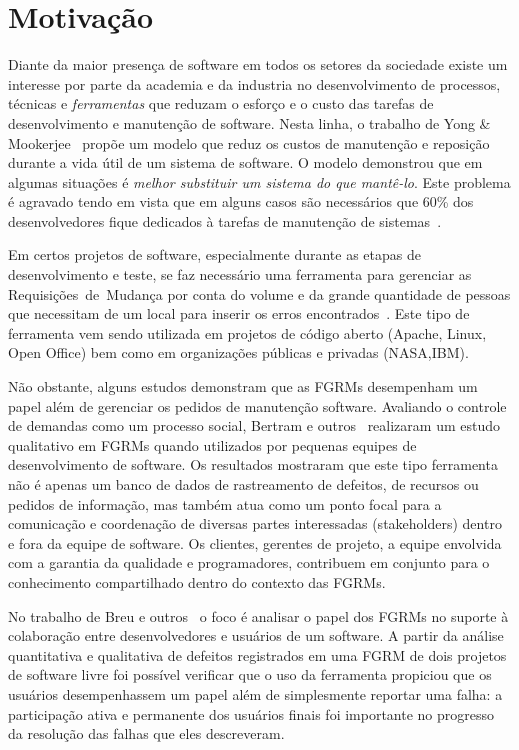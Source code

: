 \section{Motivação}
\label{sec:intro-motivacao}

Diante da maior presença de software em todos os setores da sociedade existe um
interesse por parte da academia e da industria no desenvolvimento de processos,
técnicas e \textit{ferramentas} que reduzam o esforço e o custo das tarefas de
desenvolvimento e manutenção de software. Nesta linha, o trabalho de Yong \&
Mookerjee~\cite{1423995}  propõe um modelo que reduz os custos de manutenção e
reposição durante a vida útil de um sistema de software. O modelo demonstrou que
em algumas situações é \textit{melhor substituir um sistema do que mantê-lo}.
Este pro\-ble\-ma é agravado tendo em vista que em alguns casos são necessários
que 60\% dos desenvolvedores fique dedicados à tarefas de manutenção de
sistemas~\cite{Zhang_2003}.

Em certos projetos de software, especialmente durante as etapas de
desenvolvimento e teste, se faz necessário uma ferramenta para gerenciar
as Requisições~de~Mudança por conta do volume e da grande quantidade de pessoas
que necessitam de um local para inserir os erros encontrados~\cite{1407819}.
Este tipo de ferramenta vem sendo utilizada em projetos de código
aberto (Apache, Linux, Open Office) bem como em organizações públicas e privadas
(NASA,IBM).

Não obstante, alguns estudos demonstram que as FGRMs desempenham um papel além
de gerenciar os pedidos de manutenção software. Avaliando o controle de demandas
como um processo social, Bertram e
outros~\cite{Bertram:2010:CCB:1718918.1718972} realizaram um estudo qualitativo
em FGRMs quando utilizados por pequenas equipes de desenvolvimento de software.
Os resultados mostraram que este tipo ferramenta não é apenas um banco de dados
de rastreamento de defeitos, de recursos ou pedidos de informação, mas também
atua como um ponto focal para a comunicação e coordenação de diversas partes
interessadas (stakeholders) dentro e fora da equipe de software. Os clientes,
gerentes de projeto, a equipe envolvida com a garantia da qualidade e
programadores, contribuem em conjunto para o conhecimento compartilhado dentro
do contexto das FGRMs.

No trabalho de Breu e outros~\cite{Breu:2010:INB:1718918.1718973} o foco é
analisar o papel dos FGRMs no suporte à colaboração entre desenvolvedores e
usuários de um software. A partir da análise quantitativa e qualitativa de
defeitos registrados em uma FGRM de dois projetos de software livre foi possível
verificar que o uso da ferramenta propiciou que os usuários desempenhassem um
papel além de simplesmente reportar uma falha: a participação ativa e permanente
dos usuários finais foi importante no progresso da resolução das falhas que eles
descreveram.

